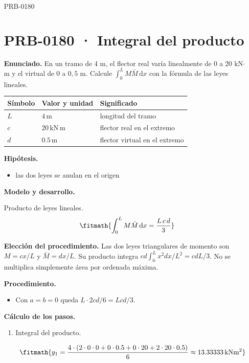 \begin{studiumworked}{PRB-0180}

\section{PRB-0180 · Integral del producto}

\textbf{Enunciado.} En un tramo de 4 m, el flector real varía linealmente de 0 a 20 kN$\cdot$m y el virtual de 0 a $0{,}5$ m. Calcule $\int_0^L M\bar{M}\,\mathrm{d}x$ con la fórmula de las leyes lineales.

\par\medskip\noindent\begin{tabular}{@{}p{.18\linewidth}p{.26\linewidth}p{.48\linewidth}@{}}
\toprule Símbolo & Valor y unidad & Significado\\\midrule
$L$ & $4\,\mathrm{m}$ & longitud del tramo\\
$c$ & $20\,\mathrm{kN\,m}$ & flector real en el extremo\\
$d$ & $0.5\,\mathrm{m}$ & flector virtual en el extremo\\
\bottomrule\end{tabular}\par\medskip

\textbf{Hipótesis.}\begin{itemize}\item las dos leyes se anulan en el origen\end{itemize}

\textbf{Modelo y desarrollo.}

Producto de leyes lineales.\[\fitmath{\int_0^L M\bar{M}\,\mathrm{d}x = \frac{L\,c\,d}{3}}\]

\textbf{Elección del procedimiento.} Las dos leyes triangulares de momento son $M=cx/L$ y $\bar M=dx/L$. Su producto integra $cd\int_0^Lx^2dx/L^2=cdL/3$. No se multiplica simplemente área por ordenada máxima.

\textbf{Procedimiento.}\begin{itemize}\item Con $a = b = 0$ queda $L \cdot 2 c d/6 = L c d/3$.\end{itemize}

\textbf{Cálculo de los pasos.}

\begin{enumerate}

\item Integral del producto.

\[\fitmath{y_{1}=\frac{4\cdot \left(2\cdot 0\cdot 0+0\cdot 0.5+0\cdot 20+2\cdot 20\cdot 0.5\right)}{6}\approx 13.33333\,\mathrm{kN m^{2}}}\]


\end{enumerate}
\end{studiumworked}
